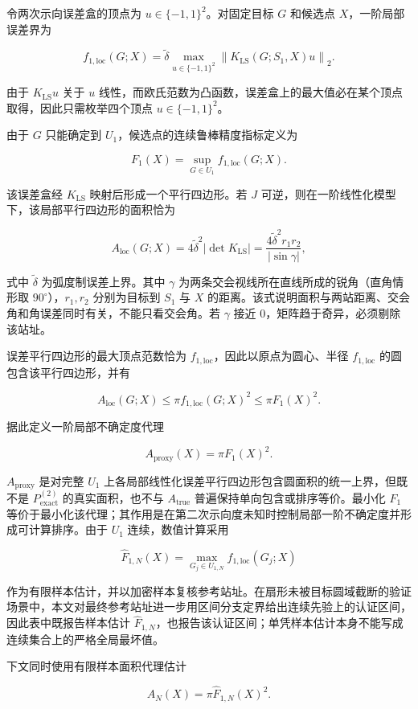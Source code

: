 令两次示向误差盒的顶点为 $u\in\{-1,1\}^2$。对固定目标 $G$ 和候选点 $X$，一阶局部误差界为

\[
f_{1,\mathrm{loc}}(G;X)
=
\tilde\delta
\max_{u\in\{-1,1\}^2}
\left\lVert
K_{\mathrm{LS}}(G;S_1,X)u
\right\rVert_2.
\]

由于 $K_{\mathrm{LS}}u$ 关于 $u$ 线性，而欧氏范数为凸函数，误差盒上的最大值必在某个顶点取得，因此只需枚举四个顶点 $u\in\{-1,1\}^2$。

由于 $G$ 只能确定到 $U_1$，候选点的连续鲁棒精度指标定义为

\[
F_1(X)=
\sup_{G\in U_1}f_{1,\mathrm{loc}}(G;X).
\]

该误差盒经 $K_{\mathrm{LS}}$ 映射后形成一个平行四边形。若 $J$ 可逆，则在一阶线性化模型下，该局部平行四边形的面积恰为

\[
A_{\mathrm{loc}}(G;X)
=
4\tilde\delta^2\left|\det K_{\mathrm{LS}}\right|
=
\frac{4\tilde\delta^2r_1r_2}{|\sin\gamma|},
\]

式中 $\tilde\delta$ 为弧度制误差上界。其中 $\gamma$ 为两条交会视线所在直线所成的锐角（直角情形取 $90^\circ$），$r_1,r_2$ 分别为目标到 $S_1$ 与 $X$ 的距离。该式说明面积与两站距离、交会角和角误差同时有关，不能只看交会角。若 $\gamma$ 接近 $0$，矩阵趋于奇异，必须剔除该站址。

误差平行四边形的最大顶点范数恰为 $f_{1,\mathrm{loc}}$，因此以原点为圆心、半径 $f_{1,\mathrm{loc}}$ 的圆包含该平行四边形，并有

\[
A_{\mathrm{loc}}(G;X)\le
\pi f_{1,\mathrm{loc}}(G;X)^2
\le
\pi F_1(X)^2.
\]

据此定义一阶局部不确定度代理

\[
A_{\mathrm{proxy}}(X)=\pi F_1(X)^2.
\]

$A_{\mathrm{proxy}}$ 是对完整 $U_1$ 上各局部线性化误差平行四边形包含圆面积的统一上界，但既不是 $P_{\mathrm{exact}}^{(2)}$ 的真实面积，也不与 $A_{\mathrm{true}}$ 普遍保持单向包含或排序等价。最小化 $F_1$ 等价于最小化该代理；其作用是在第二次示向度未知时控制局部一阶不确定度并形成可计算排序。由于 $U_1$ 连续，数值计算采用

\[
\widehat F_{1,N}(X)
=
\max_{G_j\in U_{1,N}}
f_{1,\mathrm{loc}}(G_j;X)
\]

作为有限样本估计，并以加密样本复核参考站址。在扇形未被目标圆域截断的验证场景中，本文对最终参考站址进一步用区间分支定界给出连续先验上的认证区间，因此表中既报告样本估计 $\widehat F_{1,N}$，也报告该认证区间；单凭样本估计本身不能写成连续集合上的严格全局最坏值。

下文同时使用有限样本面积代理估计

\[
\widehat A_N(X)=\pi\widehat F_{1,N}(X)^2.
\]

